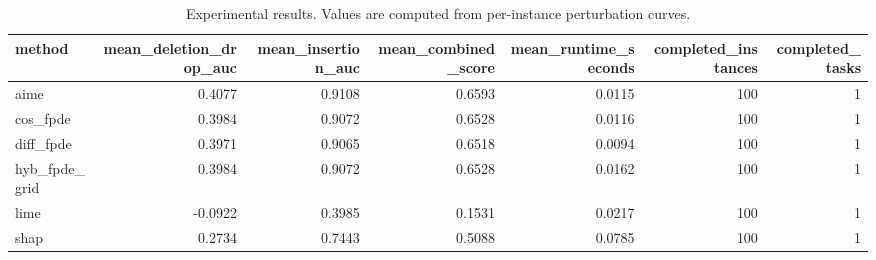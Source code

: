 \begin{table}[t]
\caption{Experimental results. Values are computed from per-instance perturbation curves.}
\label{tab:main_results_computed}
\centering
\begin{tabular}{lrrrrrr}
\toprule
method & mean\_deletion\_drop\_auc & mean\_insertion\_auc & mean\_combined\_score & mean\_runtime\_seconds & completed\_instances & completed\_tasks \\
\midrule
aime & 0.4077 & 0.9108 & 0.6593 & 0.0115 & 100 & 1 \\
cos\_fpde & 0.3984 & 0.9072 & 0.6528 & 0.0116 & 100 & 1 \\
diff\_fpde & 0.3971 & 0.9065 & 0.6518 & 0.0094 & 100 & 1 \\
hyb\_fpde\_grid & 0.3984 & 0.9072 & 0.6528 & 0.0162 & 100 & 1 \\
lime & -0.0922 & 0.3985 & 0.1531 & 0.0217 & 100 & 1 \\
shap & 0.2734 & 0.7443 & 0.5088 & 0.0785 & 100 & 1 \\
\bottomrule
\end{tabular}

\end{table}
